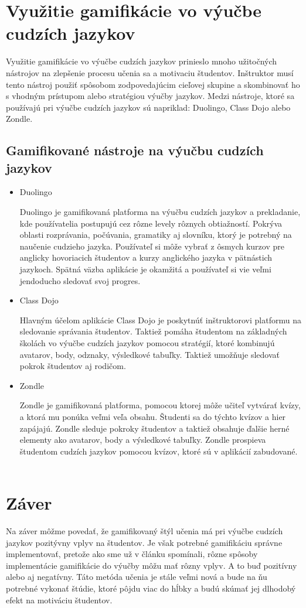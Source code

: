 \documentclass[10pt,oneside,slovak,a4paper]{article}
\begin{document}
\section{Využitie gamifikácie vo výučbe cudzích jazykov} \label{use}
Využitie gamifikácie vo výučbe cudzích jazykov prinieslo mnoho užitočných nástrojov na zlepšenie procesu učenia sa a motivaciu študentov. Inštruktor musí tento nástroj použiť spôsobom zodpovedajúcim cieľovej skupine a skombinovať ho s vhodným prístupom alebo stratégiou výučby jazykov. Medzi nástroje, ktoré sa používajú pri výučbe cudzích jazykov sú napriklad: Duolingo, Class Dojo alebo Zondle. ~\cite{flores2015using}
\subsection{Gamifikované nástroje na výučbu cudzích jazykov}
\begin{itemize}
\item Duolingo

Duolingo je gamifikovaná platforma na výučbu cudzích jazykov a prekladanie, kde používatelia postupujú cez rôzne levely rôznych obtiažností. Pokrýva oblasti rozprávania, počúvania, gramatiky aj slovníku, ktorý je potrebný na naučenie cudzieho jazyka. Používateľ si môže vybrať z ôsmych kurzov pre anglicky hovoriacich študentov a kurzy anglického jazyka v pätnástich jazykoch. Spätná väzba aplikácie je okamžitá a používateľ si vie veľmi jendoducho sledovať svoj progres. ~\cite{flores2015using}

\item Class Dojo

Hlavným účelom aplikácie Class Dojo je poskytnúť inštruktorovi platformu na sledovanie správania študentov. Taktiež pomáha študentom na základných školách vo výučbe cudzích jazykov pomocou stratégií, ktoré kombinujú avatarov, body, odznaky, výsledkové tabuľky. Taktiež umožňuje sledovať pokrok študentov aj rodičom. ~\cite{flores2015using}

\item Zondle

Zondle je gamifikovaná platforma, pomocou ktorej môže učiteľ vytvárať kvízy, a ktorá mu ponúka veľmi veľa obsahu. Študenti sa do týchto kvízov a hier zapájajú. Zondle sleduje pokroky študentov a taktiež obsahuje ďalšie herné elementy ako avatarov, body a výsledkové tabuľky. Zondle prospieva študentom cudzích jazykov pomocou kvízov, ktoré sú v aplikácií zabudované. ~\cite{flores2015using}
\end{itemize}

\label{tools}
\section{Záver} \label{zaver}
Na záver môžme povedať, že gamifikovaný štýl učenia má pri výučbe cudzích jazykov pozitývny vplyv na študentov. Je však potrebné gamifikáciu správne implementovať, pretože ako sme už v článku spomínali, rôzne spôsoby implementácie gamifikácie do výučby môžu mať rôzny vplyv. A to buď pozitívny alebo aj negatívny. Táto metóda učenia je stále veľmi nová a bude na ňu potrebné vykonať štúdie, ktoré pôjdu viac do hĺbky a budú skúmať jej dlhodobý efekt na motiváciu študentov. 



\end{document}
